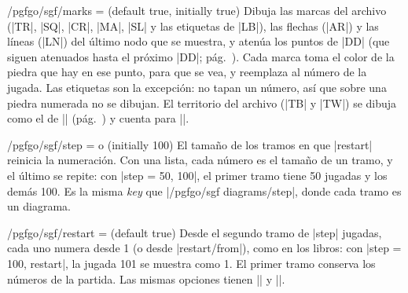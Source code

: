 \begin{key}{/pgfgo/sgf/marks =  (default true, initially true)}
	Dibuja las marcas del archivo (|TR|, |SQ|, |CR|, |MA|, |SL| y las etiquetas de |LB|), las flechas (|AR|) y las líneas (|LN|) del último nodo que se muestra, y atenúa los puntos de |DD| (que siguen atenuados hasta el próximo |DD|; pág.~\pageref{subsec:flechas}). Cada marca toma el color de la piedra que hay en ese punto, para que se vea, y reemplaza al número de la jugada. Las etiquetas son la excepción: no tapan un número, así que sobre una piedra numerada no se dibujan. El territorio del archivo (|TB| y |TW|) se dibuja como el de |\territory| (pág.~\pageref{subsec:territorio}) y cuenta para |\pgfgoscore|.

	\begin{codeexample}[]
		\begin{goban}[sgf size = variantes]
		\end{goban}

		\begin{goban}[sgf size = variantes]
		\end{goban}
	\end{codeexample}
\end{key}

\begin{key}{/pgfgo/sgf/step =  o  (initially 100)}
	El tamaño de los tramos en que |restart| reinicia la numeración. Con una lista, cada número es el tamaño de un tramo, y el último se repite: con |step = {50, 100}|, el primer tramo tiene 50 jugadas y los demás 100. Es la misma \emph{key} que |/pgfgo/sgf diagrams/step|, donde cada tramo es un diagrama.
\end{key}

\begin{key}{/pgfgo/sgf/restart =  (default true)}
	Desde el segundo tramo de |step| jugadas, cada uno numera desde 1 (o desde |restart/from|), como en los libros: con |step = 100, restart|, la jugada 101 se muestra como 1. El primer tramo conserva los números de la partida. Las mismas opciones tienen |\sgfanimation| y |\sgfdiagrams|.

	\begin{codeexample}[]
		\begin{goban}[sgf size = variantes]
		\end{goban}

		\begin{goban}[sgf size = variantes]
		\end{goban}
	\end{codeexample}
\end{key}

